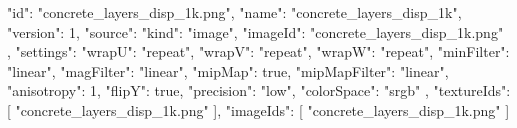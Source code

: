 {
  "id": "concrete_layers_disp_1k.png",
  "name": "concrete_layers_disp_1k",
  "version": 1,
  "source": {
    "kind": "image",
    "imageId": "concrete_layers_disp_1k.png"
  },
  "settings": {
    "wrapU": "repeat",
    "wrapV": "repeat",
    "wrapW": "repeat",
    "minFilter": "linear",
    "magFilter": "linear",
    "mipMap": true,
    "mipMapFilter": "linear",
    "anisotropy": 1,
    "flipY": true,
    "precision": "low",
    "colorSpace": "srgb"
  },
  "textureIds": [
    "concrete_layers_disp_1k.png"
  ],
  "imageIds": [
    "concrete_layers_disp_1k.png"
  ]
}
